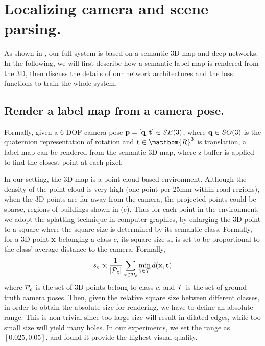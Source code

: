 
\vspace{-0.5\baselineskip}
\section{Localizing camera and scene parsing.}
\vspace{-0.3\baselineskip}
\label{sec:localize_and_parsing}
As shown in , our full system is based on a semantic 3D map and deep networks. In the following, we will first describe how a semantic label map is rendered from the 3D, then discuss the details of our network architectures and the loss functions to train the whole system.

\subsection{Render a label map from a camera pose.}
\label{sub:render}
Formally, given a 6-DOF camera pose ${\mathbf p} = [{\mathbf q}, {\mathbf t}] \in SE(3)$, where ${\mathbf q} \in SO(3)$ is the quaternion representation of rotation and $\ve{t} \in \mathbbm{R}^3$ is translation, a label map can be rendered from the semantic 3D map, where z-buffer is applied to find the closest point at each pixel.

In our setting, the 3D map is a point cloud based environment. Although the density of the point cloud is very high (one point per 25mm within road regions), when the 3D points are far away from the camera, the projected points could be sparse, \eg regions of buildings shown in (c).
Thus for each point in the environment, we adopt the splatting technique in computer graphics, by enlarging the 3D point to a square where the square size is determined by its semantic class. Formally, for a 3D point ${\mathbf x}$ belonging a class $c$, its square size $s_c$ is set to be proportional to the class' average distance to the camera. Formally,
{\vspace{-0.3\baselineskip}
\begin{align}
\label{eq:square_size}
s_c \propto \frac{1}{|{\mathcal P}_c|}\sum_{{\mathbf x}\in {\mathcal P}_c} \min_{{\mathbf t}\in{\mathcal T}} d({\mathbf x}, {\mathbf t})
\end{align}
}
where ${\mathcal P}_c$ is the set of 3D points belong to class $c$, and ${\mathcal T}$ is the set of ground truth camera poses. Then, given the relative square size between different classes, in order to obtain the absolute size for rendering, we have to define an absolute range. This is non-trivial since too large size will result in dilated edges, while too small size will yield many holes. In our experiments, we set the range as $[0.025, 0.05]$, and found it provide the highest visual quality.

